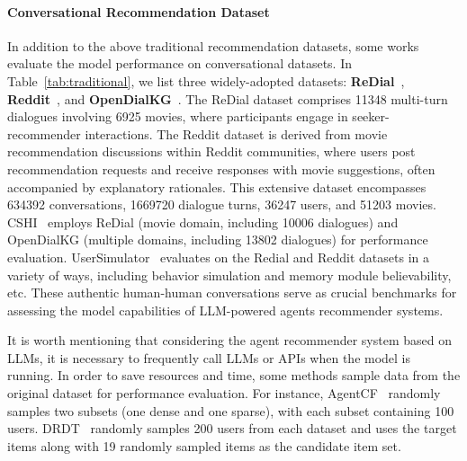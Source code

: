 

\paragraph{Conversational Recommendation Dataset}

In addition to the above traditional recommendation datasets, some works~\cite{cshi}  evaluate the model performance on conversational datasets.
In Table~\ref{tab:traditional}, we list three widely-adopted datasets: \textbf{ReDial}~\cite{li2018towards}, \textbf{Reddit}~\cite{he2023large}, and \textbf{OpenDialKG}~\cite{moon2019opendialkg}. 
The ReDial dataset comprises 11348 multi-turn dialogues involving 6925 movies, where participants engage in seeker-recommender interactions. 
The Reddit dataset is derived from movie recommendation discussions within Reddit communities, where users post recommendation requests and receive responses with movie suggestions, often accompanied by explanatory rationales. 
This extensive dataset encompasses 634392 conversations, 1669720 dialogue turns, 36247 users, and 51203 movies.
CSHI~\cite{cshi} employs ReDial (movie domain, including 10006 dialogues) and OpenDialKG (multiple domains, including 13802 dialogues) for performance evaluation.
UserSimulator~\cite{yoon2024evaluating} evaluates on the Redial and Reddit datasets in a variety of ways, including behavior simulation and memory module believability, etc.
These authentic human-human conversations serve as crucial benchmarks for assessing the model capabilities of LLM-powered agents recommender systems.


It is worth mentioning that considering the agent recommender system based on LLMs, it is necessary to frequently call LLMs or APIs when the model is running. 
In order to save resources and time, some methods sample data from the original dataset for performance evaluation.
For instance, AgentCF~\cite{zhang2024agentcf} randomly samples two subsets (one dense and one sparse), with each subset containing 100 users.
DRDT~\cite{wang2023drdt} randomly samples 200 users from each dataset and uses the target items along with 19 randomly sampled items as the candidate item set.


